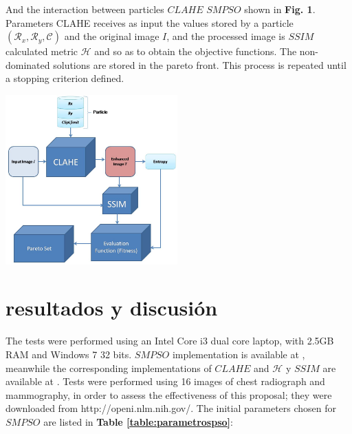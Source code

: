\documentclass[spanish,twocolumn]{article}
\begin{document}
{And the interaction between particles $CLAHE$ $SMPSO$ shown in \textbf {Fig. 1}. Parameters CLAHE receives as input the values stored by a particle $(\mathcal{R}_x,\mathcal{R}_y, \mathscr{C})$ and the original image $I$, and the processed image is $SSIM$ calculated metric $\mathscr{H}$ and so as to obtain the objective functions. The non-dominated solutions are stored in the pareto front. This process is repeated until a stopping criterion defined.



\begin{minipage}[b]{1.0\linewidth}
  \vspace{0.5cm}
  \centering
  \centerline{\includegraphics[height=6.5cm]{Figures/particula_clahe2}}
  \vspace{0.5cm}
  \label{fig:particula_clahe}
\end{minipage}

\section{resultados y discusión}
\label{sec:resultadosdiscusion}

The tests were performed using an Intel Core i3 dual core laptop, with 2.5GB RAM and Windows 7 32 bits. $SMPSO$ implementation is available at \cite{5586354}, meanwhile the corresponding implementations of $CLAHE$ and $\mathscr{H}$ y $SSIM$ are available at \cite{opencv_library}. Tests were performed using 16 images of chest radiograph and mammography, in order to assess the effectiveness of this proposal; they were downloaded from http://openi.nlm.nih.gov/. The initial parameters chosen for $SMPSO$ are listed in \textbf{Table \ref{table:parametrospso}}:

}
\end{document}
